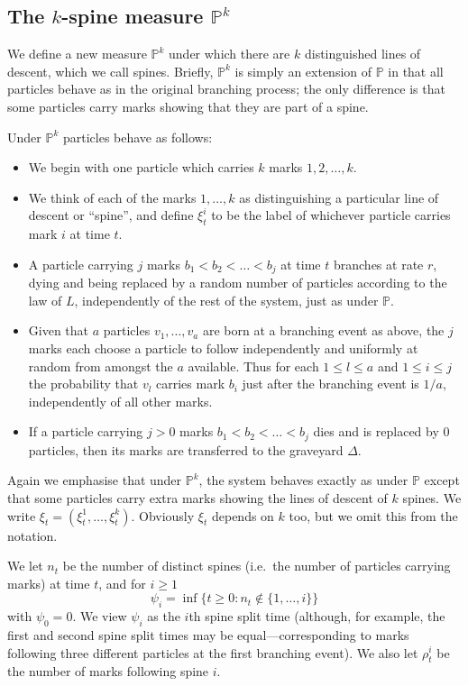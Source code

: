\documentclass{article}
\theoremstyle{plain}
\theoremstyle{definition}
\renewcommand{\P}{\mathbb{P}}
\begin{document}
\subsection{The $k$-spine measure $\P^k$}\label{pk_description}

We define a new measure $\P^k$ under which there are $k$ distinguished lines of descent, which we call spines. Briefly, $\P^k$ is simply an extension of $\P$ in that all particles behave as in the original branching process; the only difference is that some particles carry marks showing that they are part of a spine.

Under $\P^k$ particles behave as follows:
\begin{itemize}
\item We begin with one particle which carries $k$ marks $1,2,\ldots,k$.
\item We think of each of the marks $1,\ldots,k$ as distinguishing a particular line of descent or ``spine'', and define $\xi^i_t$ to be the label of whichever particle carries mark $i$ at time $t$.
\item A particle carrying $j$ marks $b_1 < b_2 < \ldots < b_j$ at time $t$ branches at rate $r$, dying and being replaced by a random number of particles according to the law of $L$, independently of the rest of the system, just as under $\P$.
\item Given that $a$ particles $v_1,\ldots,v_a$ are born at a branching event as above, the $j$ marks each choose a particle to follow independently and uniformly at random from amongst the $a$ available. Thus for each $1\leq l\leq a$ and $1\leq i \leq j$ the probability that $v_l$ carries mark $b_i$ just after the branching event is $1/a$, independently of all other marks.
\item If a particle carrying $j>0$ marks $b_1 < b_2 < \ldots < b_j$ dies and is replaced by 0 particles, then its marks are transferred to the graveyard $\Delta$.
\end{itemize}

Again we emphasise that under $\P^k$, the system behaves exactly as under $\P$ except that some particles carry extra marks showing the lines of descent of $k$ spines. We write $\xi_t = (\xi^1_t,\ldots,\xi^k_t)$. Obviously $\xi_t$ depends on $k$ too, but we omit this from the notation.

We let $n_t$ be the number of distinct spines (i.e.~the number of particles carrying marks) at time $t$, and for $i\ge 1$
\[\psi_i = \inf\{t\ge 0 : n_t\not\in \{1,\ldots, i\}\}\]
with $\psi_0=0$. We view $\psi_i$ as the $i$th spine split time (although, for example, the first and second spine split times may be equal---corresponding to marks following three different particles at the first branching event). We also let $\rho^i_t$ be the number of marks following spine $i$.
\end{document}
